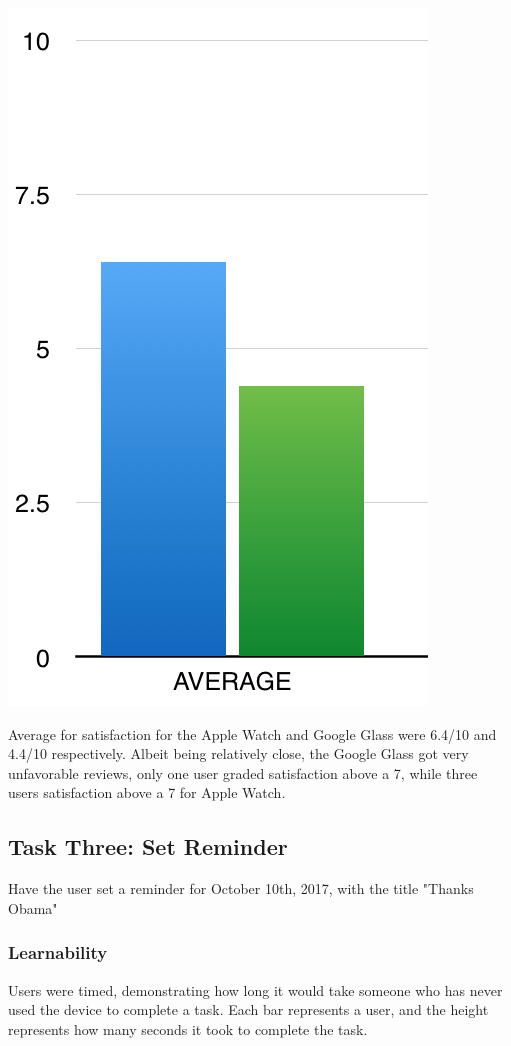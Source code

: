 \documentclass[paper=a4, fontsize=11pt]{scrartcl}	%
\numberwithin{equation}{section}															%
\numberwithin{figure}{section}																%
\numberwithin{table}{section}																%
\begin{document}
\includegraphics[scale=0.8]{task2satav}

Average for satisfaction for the Apple Watch and Google Glass were 6.4/10 and 4.4/10 respectively. Albeit being relatively close, the Google Glass got very unfavorable reviews, only one user graded satisfaction above a 7, while three users satisfaction above a 7 for Apple Watch.

\subsection{Task Three: Set Reminder}
Have the user set  a reminder for October 10th, 2017, with the title "Thanks Obama"

\subsubsection{Learnability}
Users were timed, demonstrating how long it would take someone who has never used the device to complete a task. Each bar represents a user, and the height represents how many seconds it took to complete the task. 
\end{document}
